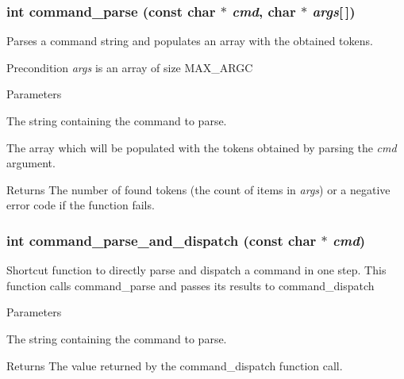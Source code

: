 \subsubsection[{command\_\-parse}]{\setlength{\rightskip}{0pt plus 5cm}int command\_\-parse (const char $\ast$ {\em cmd}, \/  char $\ast$ {\em args}[$\,$])}\label{da/d73/dispatcher_8h_afa457934f41f4c76df63346cccdf5af5}
Parses a command string and populates an array with the obtained tokens.

\begin{DoxyPrecond}{Precondition}
{\itshape args\/} is an array of size {\ttfamily MAX\_\-ARGC} 
\end{DoxyPrecond}

\begin{DoxyParams}{Parameters}
\item[\mbox{$\leftarrow$} {\em cmd}]The string containing the command to parse. \item[\mbox{$\rightarrow$} {\em args}]The array which will be populated with the tokens obtained by parsing the {\itshape cmd\/} argument.\end{DoxyParams}
\begin{DoxyReturn}{Returns}
The number of found tokens (the count of items in {\itshape args\/}) or a negative error code if the function fails. 
\end{DoxyReturn}
\subsubsection[{command\_\-parse\_\-and\_\-dispatch}]{\setlength{\rightskip}{0pt plus 5cm}int command\_\-parse\_\-and\_\-dispatch (const char $\ast$ {\em cmd})}\label{da/d73/dispatcher_8h_a8933a97708ae70540856cb1e055579d2}
Shortcut function to directly parse and dispatch a command in one step. This function calls {\ttfamily command\_\-parse} and passes its results to {\ttfamily command\_\-dispatch} 


\begin{DoxyParams}{Parameters}
\item[\mbox{$\leftarrow$} {\em cmd}]The string containing the command to parse.\end{DoxyParams}
\begin{DoxyReturn}{Returns}
The value returned by the {\ttfamily command\_\-dispatch} function call. 
\end{DoxyReturn}
